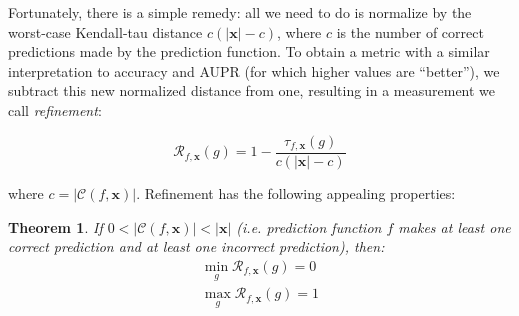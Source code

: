 \documentclass[11pt]{article}
\newtheorem{theorem}{Theorem}
\begin{document}

Fortunately, there is a simple remedy: all we need to do is normalize by the worst-case Kendall-tau distance $c(|\mathbf{x}|-c)$, where $c$ is the number of correct predictions made by the prediction function. To obtain a metric with a similar interpretation to accuracy and AUPR (for which higher values are ``better''), we subtract this new normalized distance from one, resulting in a measurement we call \emph{refinement}:

\begin{equation*}
\mathcal{R}_{f, \mathbf{x}}(g) = 1 - \frac{\tau_{f, \mathbf{x}}(g)}{c(|\mathbf{x}|-c)}
\end{equation*}

\noindent where $c = |\mathcal{C}(f, \mathbf{x})|$. Refinement has the following appealing properties:

\begin{theorem}
	If $0 < |\mathcal{C}(f, \mathbf{x})| < |\mathbf{x}|$ (i.e. prediction function $f$ makes at least one correct prediction and at least one incorrect prediction), then:
	\begin{gather*}
		\min_{g} \mathcal{R}_{f, \mathbf{x}}(g) = 0\\
		\max_{g} \mathcal{R}_{f, \mathbf{x}}(g) = 1
	\end{gather*}
\end{theorem}
\end{document}
